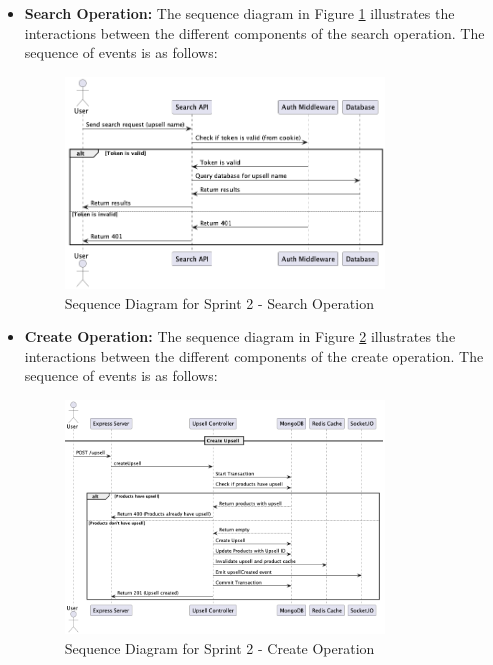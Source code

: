 \begin{itemize}
    \item \textbf{Search Operation:} The sequence diagram in Figure \ref{fig:sequence_diagram_sprint2_search} illustrates the interactions between the different components of the search operation. The sequence of events is as follows:
    \begin{figure}[H]
        \centering
        \includegraphics[width=0.8\textwidth]{images/sprintTwoSearchSequence.png}
        \caption{Sequence Diagram for Sprint 2 - Search Operation}
        \label{fig:sequence_diagram_sprint2_search}
    \end{figure}

    \item \textbf{Create Operation:} The sequence diagram in Figure \ref{fig:sequence_diagram_sprint2_create} illustrates the interactions between the different components of the create operation. The sequence of events is as follows:
    \begin{figure}[H]
        \centering
        \includegraphics[width=0.8\textwidth]{images/sprintTwoCreateSequence.png}
        \caption{Sequence Diagram for Sprint 2 - Create Operation}
        \label{fig:sequence_diagram_sprint2_create}
    \end{figure}


\end{itemize}
